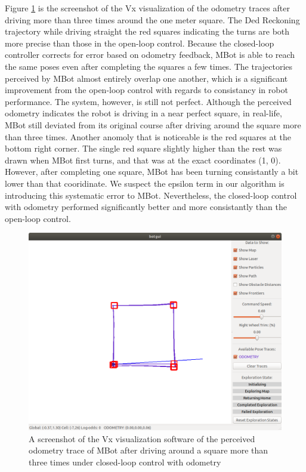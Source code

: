 \documentclass[conference]{IEEEtran}
\begin{document}
Figure \ref{fig:task5} is the screenshot of the Vx visualization of the odometry traces after driving more than three times around the one meter square. The Ded Reckoning trajectory while driving straight the red squares indicating the turns are both more precise than those in the open-loop control. Because the closed-loop controller corrects for error based on odometry feedback, MBot is able to reach the same poses even after completing the squares a few times. The trajectories perceived by MBot almost entirely overlap one another, which is a significant improvement from the open-loop control with regards to consistancy in robot performance. The system, however, is still not perfect. Although the perceived odometry indicates the robot is driving in a near perfect square, in real-life, MBot still deviated from its original course after driving around the square more than three times. Another anomoly that is noticeable is the red squares at the bottom right corner. The single red square slightly higher than the rest was drawn when MBot first turns, and that was at the exact coordinates (1, 0). However, after completing one square, MBot has been turning consistantly a bit lower than that cooridinate. We suspect the epsilon term in our algorithm is introducing this systematic error to MBot. Nevertheless, the closed-loop control with odometry performed significantly better and more consistantly than the open-loop control.

\begin{figure}
	\includegraphics[width=\linewidth]{task5.png}
	\caption{A screenshot of the Vx visualization software of the perceived odometry trace of MBot after driving around a square more than three times under closed-loop control with odometry}
	\label{fig:task5}
\end{figure}
\end{document}

